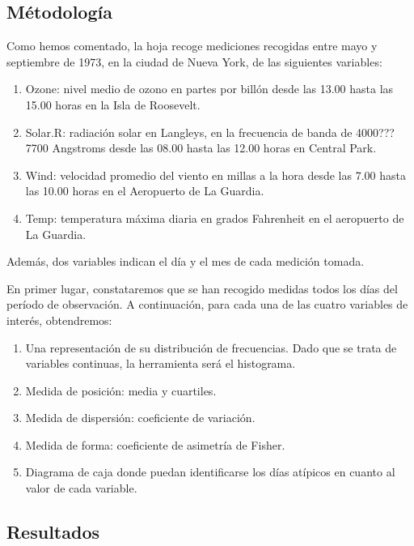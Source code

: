 \documentclass[
]{article}
\providecommand{\tightlist}{%
  \setlength{\itemsep}{0pt}\setlength{\parskip}{0pt}}
\begin{document}
\hypertarget{muxe9todologuxeda}{%
\subsection{Métodología}\label{muxe9todologuxeda}}

Como hemos comentado, la hoja recoge mediciones recogidas entre mayo y
septiembre de 1973, en la ciudad de Nueva York, de las siguientes
variables:

\begin{enumerate}
\def\labelenumi{\arabic{enumi}.}
\tightlist
\item
  Ozone: nivel medio de ozono en partes por billón desde las 13.00 hasta
  las 15.00 horas en la Isla de Roosevelt.
\item
  Solar.R: radiación solar en Langleys, en la frecuencia de banda de
  4000???7700 Angstroms desde las 08.00 hasta las 12.00 horas en Central
  Park.
\item
  Wind: velocidad promedio del viento en millas a la hora desde las 7.00
  hasta las 10.00 horas en el Aeropuerto de La Guardia.
\item
  Temp: temperatura máxima diaria en grados Fahrenheit en el aeropuerto
  de La Guardia.
\end{enumerate}

Además, dos variables indican el día y el mes de cada medición tomada.

En primer lugar, constataremos que se han recogido medidas todos los
días del período de observación. A continuación, para cada una de las
cuatro variables de interés, obtendremos:

\begin{enumerate}
\def\labelenumi{\arabic{enumi}.}
\tightlist
\item
  Una representación de su distribución de frecuencias. Dado que se
  trata de variables continuas, la herramienta será el histograma.
\item
  Medida de posición: media y cuartiles.
\item
  Medida de dispersión: coeficiente de variación.
\item
  Medida de forma: coeficiente de asimetría de Fisher.
\item
  Diagrama de caja donde puedan identificarse los días atípicos en
  cuanto al valor de cada variable.
\end{enumerate}

\hypertarget{resultados}{%
\subsection{Resultados}\label{resultados}}
\end{document}
